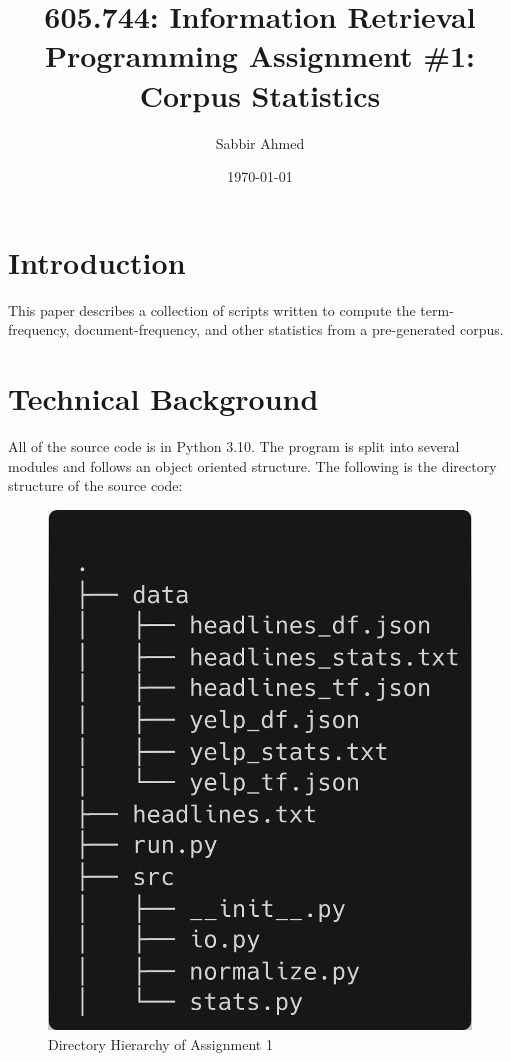 \documentclass[11pt]{article}
\title{605.744: Information Retrieval \\ Programming Assignment \#1: Corpus Statistics}
\author{Sabbir Ahmed}
\date{\today}
\begin{document}
\maketitle	

\section{Introduction}
This paper describes a collection of scripts written to compute the term-frequency, document-frequency, and other statistics from a pre-generated corpus.

\section{Technical Background}
All of the source code is in Python 3.10. The program is split into several modules and follows an object oriented structure. The following is the directory structure of the source code:

\begin{figure}[!h]
    \caption{Directory Hierarchy of Assignment 1}
    \centering
    \includegraphics[scale=0.2]{statics/dirtree.png}
\end{figure}
\end{document}
